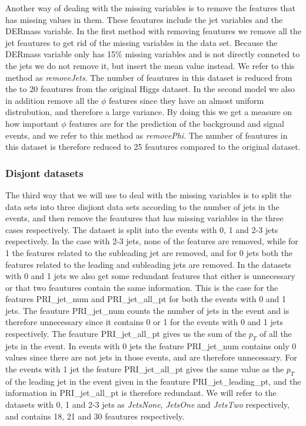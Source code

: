\documentclass[../../main/main.tex]{subfiles}
\begin{document}
Another way of dealing with the missing variables is to remove the features that has missing values in them. These feautures include the jet variables and the DERmass variable. In the first method with removing feautures we remove all the jet feautures to get rid of the missing variables in the data set. Because the DERmass variable only has 15\% missing variables and is not directly conneted to the jets we do not remove it, but insert the mean value instead. We refer to this method as \emph{removeJets}. The number of feautures in this dataset is reduced from the to 20 feautures from the original Higgs dataset. In the second model we also in addition remove all the \(\phi\) features since they have an almost uniform distrubution, and therefore a large variance. By doing this we get a measure on how important \(\phi\) features are for the prediction of the background and signal events, and we refer to this method as \emph{removePhi}. The number of feautures in this dataset is therefore reduced to 25 feautures compared to the original dataset.

\subsubsection{Disjont datasets}
\label{sec:disjont-datasets}

The third way that we will use to deal with the missing variables is to split the data sets into three disjiont data sets according to the number of jets in the events, and then remove the feautures that has missing variables in the three cases respectively. The dataset is split into the events with 0, 1 and 2-3 jets respectively. In the case with 2-3 jets, none of the features are removed, while for 1 the features related to the subleading jet are removed, and for 0 jets both the features related to the leading and subleading jets are removed. In the datasets with 0 and 1 jets we also get some redundant features that either is unnecessary or that two feautures contain the same information. This is the case for the features PRI\_jet\_num and PRI\_jet\_all\_pt for both the events with 0 and 1 jets. The feauture PRI\_jet\_num counts the number of jets in the event and is therefore unnecessary since it contains 0 or 1 for the events with 0 and 1 jets respectively. The feauture PRI\_jet\_all\_pt gives us the sum of the \(p_T\) of all the jets in the event. In events with 0 jets the feature PRI\_jet\_num contains only 0 values since there are not jets in those events, and are therefore unnecessary. For the events with 1 jet the feature PRI\_jet\_all\_pt gives the same value as the \(p_T\) of the leading jet in the event given in the feauture PRI\_jet\_leading\_pt, and the information in PRI\_jet\_all\_pt is therefore redundant. We will refer to the datasets with 0, 1 and 2-3 jets as \emph{JetsNone}, \emph{JetsOne} and \emph{JetsTwo} respectively, and contains 18, 21 and 30 feautures respectively.
\end{document}
